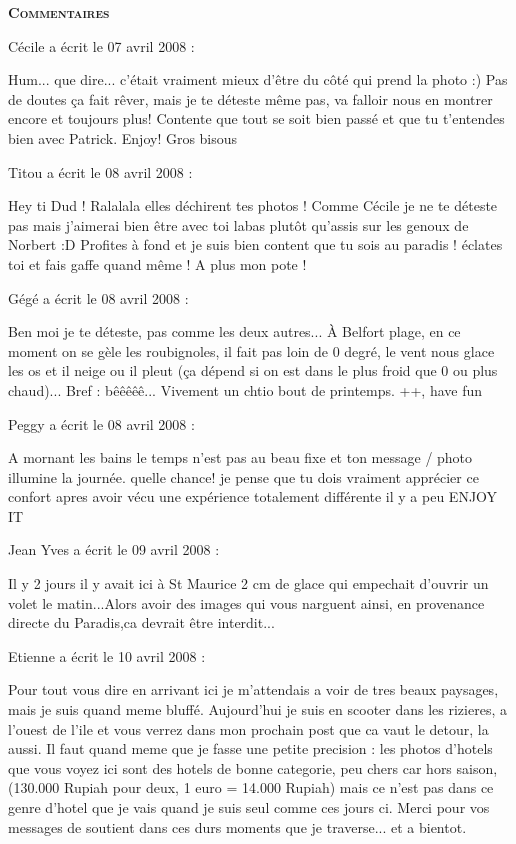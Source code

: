 \bigskip
\textbf{\textsc{Commentaires}}

\medskip
Cécile a écrit le 07 avril 2008 :
\begin{displayquote}
Hum... que dire... c'était vraiment mieux d'être du côté qui prend la photo :) Pas de doutes ça fait rêver, mais je te déteste même pas, va falloir nous en montrer encore et toujours plus!
Contente que tout se soit bien passé et que tu t'entendes bien avec Patrick. Enjoy!
Gros bisous
\end{displayquote}

\medskip
Titou a écrit le 08 avril 2008 :
\begin{displayquote}
Hey ti Dud !
Ralalala elles déchirent tes photos ! Comme Cécile je ne te déteste pas mais j'aimerai bien être avec toi labas plutôt qu'assis sur les genoux de Norbert :D
Profites à fond et je suis bien content que tu sois au paradis ! éclates toi et fais gaffe quand même !
A plus mon pote !
\end{displayquote}

\medskip
Gégé a écrit le 08 avril 2008 :
\begin{displayquote}
Ben moi je te déteste, pas comme les deux autres...
À Belfort plage, en ce moment on se gèle les roubignoles, il fait pas loin de 0 degré, le vent nous glace les os et il neige ou il pleut (ça dépend si on est dans le plus froid que 0 ou plus chaud)... Bref : bêêêêê...
Vivement un chtio bout de printemps.
++, have fun
\end{displayquote}

\medskip
Peggy a écrit le 08 avril 2008 :
\begin{displayquote}
A mornant les bains le temps n'est pas au beau fixe et ton message / photo illumine la journée.
quelle chance!
je pense que tu dois vraiment apprécier ce confort apres avoir vécu une expérience totalement différente il y a peu
ENJOY IT
\end{displayquote}

\medskip
Jean Yves  a écrit le 09 avril 2008 :
\begin{displayquote}
Il y 2 jours il y avait ici à St Maurice 2 cm de glace qui empechait d'ouvrir un volet le matin...Alors avoir des images qui vous narguent ainsi, en provenance directe du Paradis,ca devrait être interdit...
\end{displayquote}

\medskip
Etienne a écrit le 10 avril 2008 :
\begin{displayquote}
Pour tout vous dire en arrivant ici je m'attendais a voir de tres beaux paysages, mais je suis quand meme bluffé.
Aujourd'hui je suis en scooter dans les rizieres, a l'ouest de l'ile et vous verrez dans mon prochain post que ca vaut le detour, la aussi.
Il faut quand meme que je fasse une petite precision : les photos d'hotels que vous voyez ici sont des hotels de bonne categorie, peu chers car hors saison, (130.000 Rupiah pour deux, 1 euro = 14.000 Rupiah) mais ce n'est pas dans ce genre d'hotel que je vais quand je suis seul comme ces jours ci.
Merci pour vos messages de soutient dans ces durs moments que je traverse... et a bientot.
\end{displayquote}

